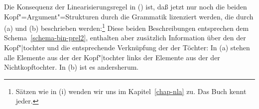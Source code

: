 Die%
Konsequenz der Linearisierungsregel in () ist, daß jetzt nur noch die beiden 
Kopf"=Argument"=Strukturen durch die Grammatik lizenziert werden, die durch (a) und
(b) beschrieben werden:\footnote{
  Sätzen wie in (i) wenden wir uns im Kapitel~\ref{chap-nla} zu.
  \ea
  Das Buch kennt jeder.
  \zlast
}
\eal
\ex {}
\ex {}
\zl
Diese beiden Beschreibungen entsprechen dem Schema~\ref{schema-bin-prel2},
enthalten aber zusätzlich Information über den \initialw der
Kopf"|tochter und die entsprechende Verknüpfung der \phonwe
der Töchter: In (a) stehen alle Elemente aus der \phonl der Kopf"|tochter
links der Elemente aus der \phonl der Nichtkopftochter. In (b)
ist es andersherum.

